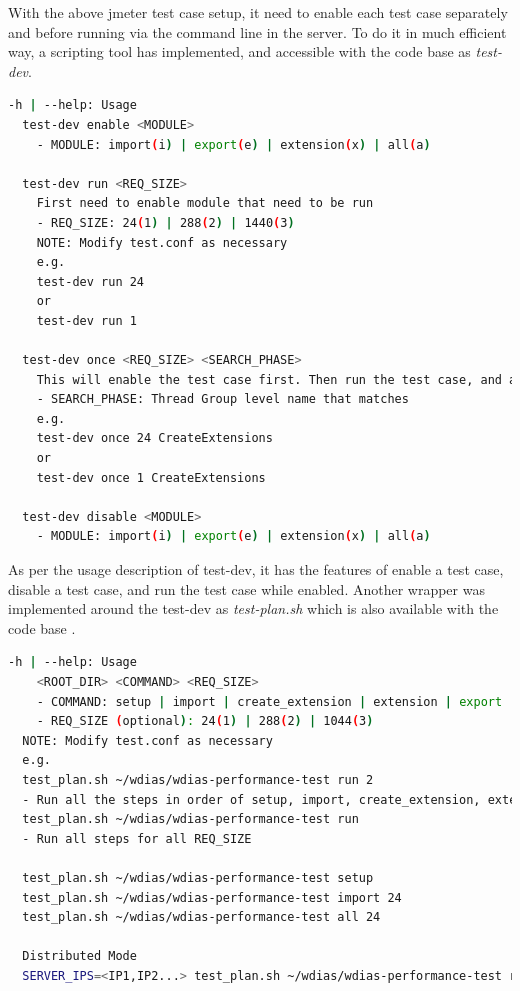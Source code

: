 
With the above \acrshort{jmeter} test case setup, it need to enable each test case separately and before running via the command line in the server. To do it in much efficient way, a scripting tool has implemented, and accessible with the code base \cite{KarunarathneWdias-performance-test/TEST_PLAN.md:Plan} as \emph{test-dev}.

\begin{lstlisting}[language=sh, caption=Performance Test Help]
-h | --help: Usage
  test-dev enable <MODULE>
    - MODULE: import(i) | export(e) | extension(x) | all(a)

  test-dev run <REQ_SIZE>
    First need to enable module that need to be run
    - REQ_SIZE: 24(1) | 288(2) | 1440(3)
    NOTE: Modify test.conf as necessary
    e.g.
    test-dev run 24
    or
    test-dev run 1

  test-dev once <REQ_SIZE> <SEARCH_PHASE>
    This will enable the test case first. Then run the test case, and at the end disable and exit.
    - SEARCH_PHASE: Thread Group level name that matches
    e.g.
    test-dev once 24 CreateExtensions
    or
    test-dev once 1 CreateExtensions

  test-dev disable <MODULE>
    - MODULE: import(i) | export(e) | extension(x) | all(a)
\end{lstlisting}

As per the usage description of test-dev, it has the features of enable a test case, disable a test case, and run the test case while enabled.
Another wrapper was implemented around the test-dev as \emph{test-plan.sh} which is also available with the code base \cite{KarunarathneWdias-performance-test/TEST_PLAN.md:Plan}.

\begin{lstlisting}[language=sh, caption=Test Plan Help]
-h | --help: Usage
    <ROOT_DIR> <COMMAND> <REQ_SIZE>
    - COMMAND: setup | import | create_extension | extension | export | all | query
    - REQ_SIZE (optional): 24(1) | 288(2) | 1044(3)
  NOTE: Modify test.conf as necessary
  e.g.
  test_plan.sh ~/wdias/wdias-performance-test run 2
  - Run all the steps in order of setup, import, create_extension, extension, export, all, query
  test_plan.sh ~/wdias/wdias-performance-test run
  - Run all steps for all REQ_SIZE

  test_plan.sh ~/wdias/wdias-performance-test setup
  test_plan.sh ~/wdias/wdias-performance-test import 24
  test_plan.sh ~/wdias/wdias-performance-test all 24

  Distributed Mode
  SERVER_IPS=<IP1,IP2...> test_plan.sh ~/wdias/wdias-performance-test run
\end{lstlisting}

